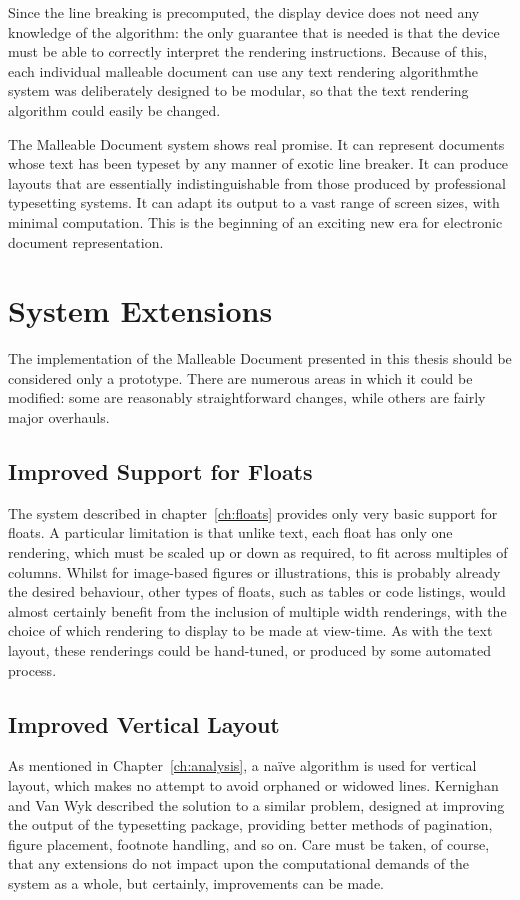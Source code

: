 Since the line breaking is precomputed, the display device does not need any knowledge of the algorithm: the only guarantee that is needed is that the device must be able to correctly interpret the rendering instructions. Because of this, each individual malleable document can use any text rendering algorithm\ed the system was deliberately designed to be modular, so that the text rendering algorithm could easily be changed.

The Malleable Document system shows real promise. It can represent documents whose text has been typeset by any manner of exotic line breaker. It can produce layouts that are essentially indistinguishable from those produced by professional typesetting systems. It can adapt its output to a vast range of screen sizes, with minimal computation. This is the beginning of an exciting new era for electronic document representation.


\section{System Extensions}
The implementation of the Malleable Document presented in this thesis should be considered only a prototype. There are numerous areas in which it could be modified: some are reasonably straightforward changes, while others are fairly major overhauls.


\subsection{Improved Support for Floats}
The system described in chapter~\ref{ch:floats} provides only very basic support for floats. A particular limitation is that unlike text, each float has only one rendering, which must be scaled up or down as required, to fit across multiples of columns. Whilst for image-based figures or illustrations, this is probably already the desired behaviour, other types of floats, such as tables or code listings, would almost certainly benefit from the inclusion of multiple width renderings, with the choice of which rendering to display to be made at view-time. As with the text layout, these renderings could be hand-tuned, or produced by some automated process. 

\subsection{Improved Vertical Layout}
As mentioned in Chapter~\ref{ch:analysis}, a na\"ive algorithm is used for vertical layout, which makes no attempt to avoid orphaned or widowed lines. Kernighan and Van Wyk\hspace{0pt}\cite{Kernighan1989} described the solution to a similar problem, designed at improving the output of the \troff{} typesetting package, providing better methods of pagination, figure placement, footnote handling, and so on. Care must be taken, of course, that any extensions do not impact upon the computational demands of the system as a whole, but certainly, improvements can be made.


